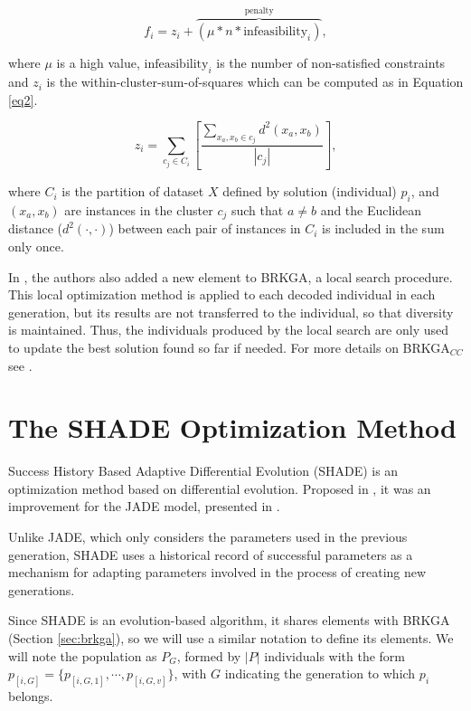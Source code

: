 \documentclass[review]{elsarticle}
\begin{document}
\begin{equation}
f_i = z_i + \overbrace{(\mu * n * \text{infeasibility}_i)}^\text{penalty},
\label{eq1}
\end{equation}

\noindent where $\mu$ is a high value, $\text{infeasibility}_i$ is the number of non-satisfied constraints and $z_i$ is the within-cluster-sum-of-squares which can be computed as in Equation \eqref{eq2}.

\begin{equation}
z_i = \sum_{c_j \in C_i} \left[ \frac{\sum_{x_a, x_b \in c_j} d^2(x_a,x_b)}{|c_j|}\right],
\label{eq2}
\end{equation}

\noindent where $C_i$ is the partition of dataset $X$ defined by solution (individual) $p_i$, and $(x_a, x_b)$ are instances in the cluster $c_j$ such that $a \neq b$ and the Euclidean distance ($d^2(\cdot, \cdot)$) between each pair of instances in $C_i$ is included in the sum only once.

In \cite{de2017comparison}, the authors also added a new element to BRKGA, a local search procedure. This local optimization method is applied to each decoded individual in each generation, but its results are not transferred to the individual, so that diversity is maintained. Thus, the individuals produced by the local search are only used to update the best solution found so far if needed. For more details on BRKGA$_{CC}$ see \cite{de2017comparison}.

\section{The SHADE Optimization Method} \label{sec:SHADE}

Success History Based Adaptive Differential Evolution (SHADE) is an optimization method based on differential evolution. Proposed in \cite{tanabe2013success}, it was an improvement for the JADE model, presented in \cite{zhang2009jade}.

Unlike JADE, which only considers the parameters used in the previous generation, SHADE uses a historical record of successful parameters as a mechanism for adapting parameters involved in the process of creating new generations.

Since SHADE is an evolution-based algorithm, it shares elements with BRKGA (Section \ref{sec:brkga}), so we will use a similar notation to define its elements. We will note the population as $P_G$, formed by $|P|$ individuals with the form $p_{[i,G]} = \{p_{[i,G,1]}, \cdots, p_{[i,G,v]}\}$, with $G$ indicating the generation to which $p_i$ belongs.
\end{document}
